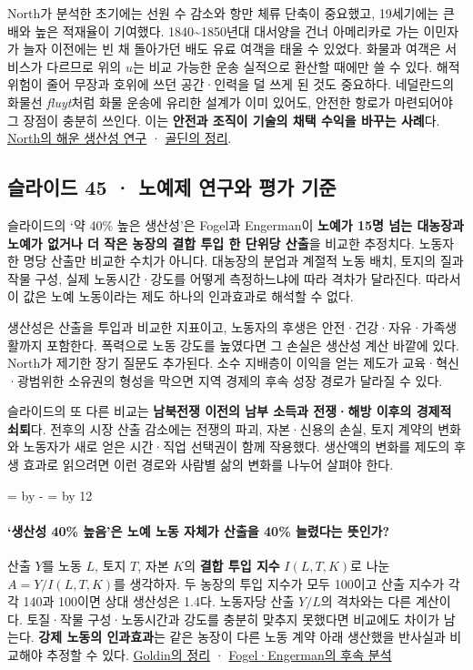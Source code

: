 \documentclass[10pt,a4paper]{article}
\newcommand{\ReserveQuestionSpace}{%
  \par\begingroup
  \dimen0=\pagegoal \advance\dimen0 by -\pagetotal
  \dimen2=\baselineskip \multiply\dimen2 by 12
  \ifdim\dimen0<\dimen2 \newpage\fi
  \endgroup}
\begin{document}
North가 분석한 초기에는 선원 수 감소와 항만 체류 단축이 중요했고, 19세기에는 큰 배와 높은 적재율이 기여했다. 1840\textasciitilde{}1850년대 대서양을 건너 아메리카로 가는 이민자가 늘자 이전에는 빈 채 돌아가던 배도 유료 여객을 태울 수 있었다. 화물과 여객은 서비스가 다르므로 위의 $u$는 비교 가능한 운송 실적으로 환산할 때에만 쓸 수 있다. 해적 위험이 줄어 무장과 호위에 쓰던 공간·인력을 덜 쓰게 된 것도 중요하다. 네덜란드의 화물선 \emph{fluyt}처럼 화물 운송에 유리한 설계가 이미 있어도, 안전한 항로가 마련되어야 그 장점이 충분히 쓰인다. 이는 \textbf{안전과 조직이 기술의 채택 수익을 바꾸는 사례}다. \href{https://www.journals.uchicago.edu/doi/abs/10.1086/259462}{North의 해운 생산성 연구} · \href{https://goldin.scholars.harvard.edu/sites/g/files/omnuum5966/files/goldin/files/cliometrics.pdf}{골딘의 정리}.\par

\subsection{슬라이드 45 · 노예제 연구와 평가 기준}
슬라이드의 ‘약 40\% 높은 생산성’은 Fogel과 Engerman이 \textbf{노예가 15명 넘는 대농장과 노예가 없거나 더 작은 농장의 결합 투입 한 단위당 산출}을 비교한 추정치다. 노동자 한 명당 산출만 비교한 수치가 아니다. 대농장의 분업과 계절적 노동 배치, 토지의 질과 작물 구성, 실제 노동시간·강도를 어떻게 측정하느냐에 따라 격차가 달라진다. 따라서 이 값은 노예 노동이라는 제도 하나의 인과효과로 해석할 수 없다.\par

생산성은 산출을 투입과 비교한 지표이고, 노동자의 후생은 안전·건강·자유·가족생활까지 포함한다. 폭력으로 노동 강도를 높였다면 그 손실은 생산성 계산 바깥에 있다. North가 제기한 장기 질문도 추가된다. 소수 지배층이 이익을 얻는 제도가 교육·혁신·광범위한 소유권의 형성을 막으면 지역 경제의 후속 성장 경로가 달라질 수 있다.\par

슬라이드의 또 다른 비교는 \textbf{남북전쟁 이전의 남부 소득과 전쟁·해방 이후의 경제적 쇠퇴}다. 전후의 시장 산출 감소에는 전쟁의 파괴, 자본·신용의 손실, 토지 계약의 변화와 노동자가 새로 얻은 시간·직업 선택권이 함께 작용했다. 생산액의 변화를 제도의 후생 효과로 읽으려면 이런 경로와 사람별 삶의 변화를 나누어 살펴야 한다.\par

\ReserveQuestionSpace
\paragraph{‘생산성 40\% 높음’은 노예 노동 자체가 산출을 40\% 늘렸다는 뜻인가?}
산출 $Y$를 노동 $L$, 토지 $T$, 자본 $K$의 \textbf{결합 투입 지수} $I(L,T,K)$로 나눈 $A=Y/I(L,T,K)$를 생각하자. 두 농장의 투입 지수가 모두 100이고 산출 지수가 각각 140과 100이면 상대 생산성은 1.4다. 노동자당 산출 $Y/L$의 격차와는 다른 계산이다. 토질·작물 구성·노동시간과 강도를 충분히 맞추지 못했다면 비교에도 차이가 남는다. \textbf{강제 노동의 인과효과}는 같은 농장이 다른 노동 계약 아래 생산했을 반사실과 비교해야 추정할 수 있다. \href{https://www.aeaweb.org/articles?id=10.1257/jep.9.2.191}{Goldin의 정리} · \href{https://ideas.repec.org/a/aea/aecrev/v67y1977i3p275-96.html}{Fogel·Engerman의 후속 분석}\par
\end{document}
